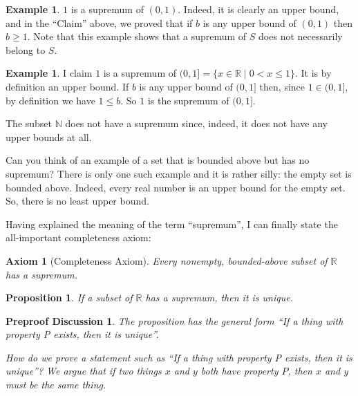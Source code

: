\documentclass[12pt]{amsart}
\newcommand{\R}{{\mathbb{R}}}
\newcommand{\N}{\mathbb{N}}
\numberwithin{equation}{section}
\theoremstyle{plain} %
\newtheorem{preproof}{Preproof Discussion}
\newtheorem*{question}{Question}
\newtheorem{prop}[equation]{Proposition}
\newtheorem*{axiom*}{Axiom}
\theoremstyle{definition}
\newtheorem{ex}[equation]{Example}
\theoremstyle{remark}
\begin{document}
\begin{ex} $1$ is a supremum of $(0,1)$. Indeed, it is clearly an upper bound, and 
in the ``Claim'' above, we proved that if $b$ is any upper bound of $(0,1)$ then $b \geq 1$. Note that this example shows that a supremum of $S$ does not necessarily 
belong to $S$.
\end{ex}

\begin{ex} I claim $1$ is  a supremum of $(0,1] = \{x \in \R \mid 0 <
  x \leq 1\}$. It is by definition an upper bound. If $b$ is any upper bound of $(0, 1]$ then, since $1 \in (0, 
  1]$, by definition
  we have $1 \leq b$. So $1$ is the supremum of $(0,1]$. 
\end{ex}



The subset $\N$ does not have a supremum since, indeed, it does not have any upper bounds at all.




Can you think of an example of a set that is bounded above but has no supremum? There is only one such example and it is rather silly: the empty set is
bounded above. Indeed, every real number is an upper bound for the empty set. So, there is no least upper bound.

Having explained the meaning of the term ``supremum'', I can finally state the all-important completeness axiom:


\begin{axiom*}[Completeness Axiom] Every nonempty, bounded-above subset of $\R$ has a supremum.
\end{axiom*}


\begin{prop} If a subset of $\R$ has a supremum, then it is unique.
\end{prop}

\begin{preproof} The proposition has the general form  ``If a thing with property P exists, then it is unique''. 
	
  How do we prove a statement such as
  ``If a thing with property P exists, then it is unique''?
  We argue that if two things $x$ and $y$ both have property $P$, then $x$ and $y$ must be the same thing.
\end{preproof}
\end{document}
